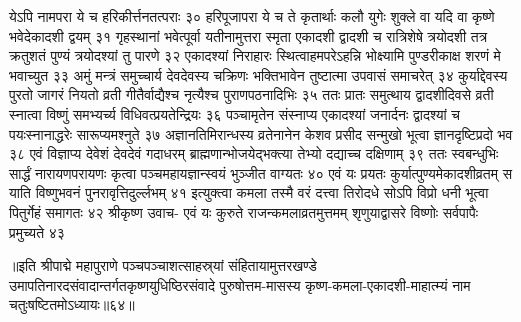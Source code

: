 येऽपि नामपरा ये च हरिकीर्त्तनतत्पराः ३०
हरिपूजापरा ये च ते कृतार्थाः कलौ युगेः 
शुक्ले वा यदि वा कृष्णे भवेदेकादशी द्वयम् ३१
गृहस्थानां भवेत्पूर्वा यतीनामुत्तरा स्मृता 
एकादशी द्वादशी च रात्रिशेषे त्रयोदशी 
तत्र क्रतुशतं पुण्यं त्रयोदश्यां तु पारणे ३२
एकादश्यां निराहारः स्थित्वाहमपरेऽहन्नि 
भोक्ष्यामि पुण्डरीकाक्ष शरणं मे भवाच्युत ३३
अमुं मन्त्रं समुच्चार्य देवदेवस्य चक्रिणः 
भक्तिभावेन तुष्टात्मा उपवासं समाचरेत् ३४
कुर्याद्देवस्य पुरतो जागरं नियतो व्रती 
गीतैर्वाद्यैश्च नृत्यैश्च पुराणपठनादिभिः ३५
ततः प्रातः समुत्थाय द्वादशीदिवसे व्रती 
स्नात्वा विष्णुं समभ्यर्च्य विधिवत्प्रयतेन्द्रियः ३६
पञ्चामृतेन संस्नाप्य एकादश्यां जनार्दनः 
द्वादश्यां च पयःस्नानाद्धरेः सारूप्यमश्नुते ३७
अज्ञानतिमिरान्धस्य व्रतेनानेन केशव 
प्रसीद सन्मुखो भूत्वा ज्ञानदृष्टिप्रदो भव ३८
एवं विज्ञाप्य देवेशं देवदेवं गदाधरम् 
ब्राह्मणान्भोजयेद्भक्त्या तेभ्यो दद्याच्च दक्षिणाम् ३९
ततः स्वबन्धुभिः सार्द्धं नारायणपरायणः 
कृत्वा पञ्चमहायज्ञान्स्वयं भुञ्जीत वाग्यतः ४०
एवं यः प्रयतः कुर्यात्पुण्यमेकादशीव्रतम् 
स याति विष्णुभवनं पुनरावृत्तिदुर्ल्लभम् ४१
इत्युक्त्वा कमला तस्मै वरं दत्त्वा तिरोदधे 
सोऽपि विप्रो धनी भूत्वा पितुर्गेहं समागतः ४२
श्रीकृष्ण उवाच-
एवं यः कुरुते राजन्कमलाव्रतमुत्तमम् 
शृणुयाद्वासरे विष्णोः सर्वपापैः प्रमुच्यते ४३

॥इति श्रीपाद्मे महापुराणे पञ्चपञ्चाशत्साहस्र्यां संहितायामुत्तरखण्डे उमापतिनारदसंवादान्तर्गतकृष्णयुधिष्ठिरसंवादे पुरुषोत्तम-मासस्य कृष्ण-कमला-एकादशी-माहात्म्यं नाम चतुःषष्टितमोऽध्यायः॥६४॥



